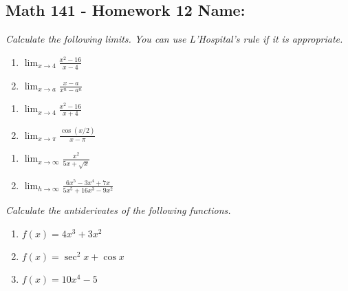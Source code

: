 \documentclass[11pt]{article}
\newcommand{\ds}{\displaystyle}
\begin{document}
\pagestyle{empty}
\subsection*{Math 141 - Homework 12 \hfill Name: \underline{\hspace*{2in}}}


\textit{Calculate the following limits. You can use L'Hospital's rule if it is appropriate.}
\begin{multicols}{2}
\begin{enumerate}
\item $\ds \lim_{x \rightarrow 4} \frac{x^2 - 16}{x-4}$
\item $\ds \lim_{x \rightarrow a} \frac{x-a}{x^n - a^n}$
\setcounter{enumCount}{\theenumi}
\end{enumerate}
\end{multicols}
\vfill

\noindent
\begin{multicols}{2}
\begin{enumerate}
\setcounter{enumi}{\theenumCount}
\item $\ds \lim_{x \rightarrow 4} \frac{x^2 - 16}{x+4}$
\item $\ds \lim_{x \rightarrow \pi} \frac{\cos(x/2)}{x-\pi}$
\setcounter{enumCount}{\theenumi}
\end{enumerate}
\end{multicols}
\vfill

\noindent
\begin{multicols}{2}
\begin{enumerate}
\setcounter{enumi}{\theenumCount}
\item $\ds \lim_{x \rightarrow \infty} \frac{x^2}{5x + \sqrt{x}}$
\item $\ds \lim_{h \rightarrow \infty} \frac{6x^5 - 3x^4 + 7x}{5x^5 + 16x^3 - 9 x^2}$
\setcounter{enumCount}{\theenumi}
\end{enumerate}
\end{multicols}
\vfill


\noindent
\textit{Calculate the antiderivates of the following functions.}

\begin{multicols}{3}
\begin{enumerate}
\setcounter{enumi}{\theenumCount}
\item $f(x) = 4x^3 + 3x^2$
\item $f(x) = \sec^2 x + \cos x$
\item $f(x) = 10x^4 - 5$
\setcounter{enumCount}{\theenumi}
\end{enumerate}
\end{multicols}
\vfill
\end{document}
